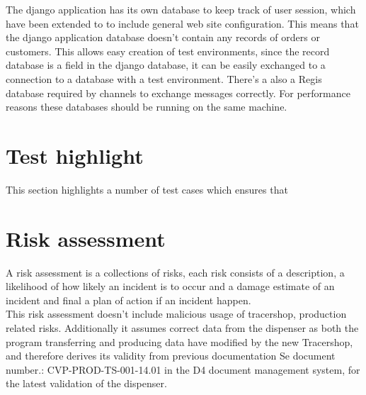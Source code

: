 \documentclass{article}
\begin{document}
The django application has its own database to keep track of user session, which have been extended to to include general web site configuration.
This means that the django application database doesn't contain any records of orders or customers. This allows easy creation of test environments,
since the record database is a field in the django database, it can be easily exchanged to a connection to a database with a test environment.
There's a also a Regis database required by channels to exchange messages correctly. For performance reasons these databases should be running on the same machine.

\section*{Test highlight}
This section highlights a number of test cases which ensures that



\section*{Risk assessment}
A risk assessment is a collections of risks, each risk consists of a description, a likelihood of how likely an incident is to occur and a damage estimate of an incident
and final a plan of action if an incident happen. \\
This risk assessment doesn't include malicious usage of tracershop, production related risks.
Additionally it assumes correct data from the dispenser as both the program transferring and producing data have modified by the new Tracershop,
and therefore derives its validity from previous documentation Se document number.: CVP-PROD-TS-001-14.01 in the D4 document management system,
for the latest validation of the dispenser.
\end{document}
